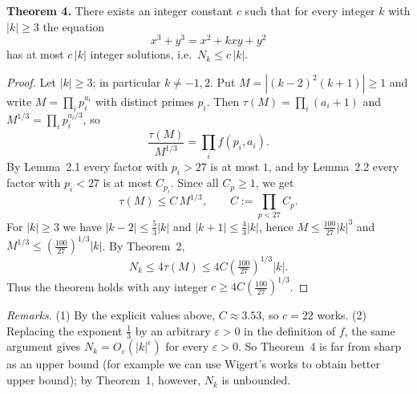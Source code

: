 \begin{thmbox}
\textbf{Theorem 4.} There exists an integer constant $c$ such that for every integer $k$ with $|k|\ge 3$ the equation
\[
x^3+y^3=x^2+kxy+y^2
\]
has at most $c\,|k|$ integer solutions, i.e.\ $N_k\le c\,|k|$.
\end{thmbox}

\begin{proof}
Let $|k|\ge 3$; in particular $k\neq -1,2$. Put $M=\left|(k-2)^2(k+1)\right|\ge 1$ and write $M=\prod_i p_i^{a_i}$ with distinct primes $p_i$. Then $\tau(M)=\prod_i(a_i+1)$ and $M^{1/3}=\prod_i p_i^{a_i/3}$, so
\[
\frac{\tau(M)}{M^{1/3}}=\prod_i f(p_i,a_i).
\]
By Lemma~2.1 every factor with $p_i>27$ is at most $1$, and by Lemma~2.2 every factor with $p_i<27$ is at most $C_{p_i}$. Since all $C_p\ge 1$, we get
\[
\tau(M)\le C\,M^{1/3},\qquad C:=\prod_{p<27}C_p .
\]
For $|k|\ge 3$ we have $|k-2|\le \frac53|k|$ and $|k+1|\le\frac43|k|$, hence $M\le \frac{100}{27}|k|^3$ and $M^{1/3}\le \left(\frac{100}{27}\right)^{1/3}|k|$. By Theorem~2,
\[
N_k\le 4\tau(M)\le 4C\left(\tfrac{100}{27}\right)^{1/3}|k| .
\]
Thus the theorem holds with any integer $c\ge 4C\left(\frac{100}{27}\right)^{1/3}$.
\end{proof}

\noindent\textit{Remarks.} (1) By the explicit values above, $C\approx 3.53$, so $c=22$ works.
(2) Replacing the exponent $\frac13$ by an arbitrary $\varepsilon>0$ in the definition of $f$, the same argument gives $N_k=O_\varepsilon\!\left(|k|^{\varepsilon}\right)$ for every $\varepsilon>0$. So Theorem~4 is far from sharp as an upper bound (for example we can use Wigert's works to obtain better upper bound); by Theorem~1, however, $N_k$ is unbounded. 
